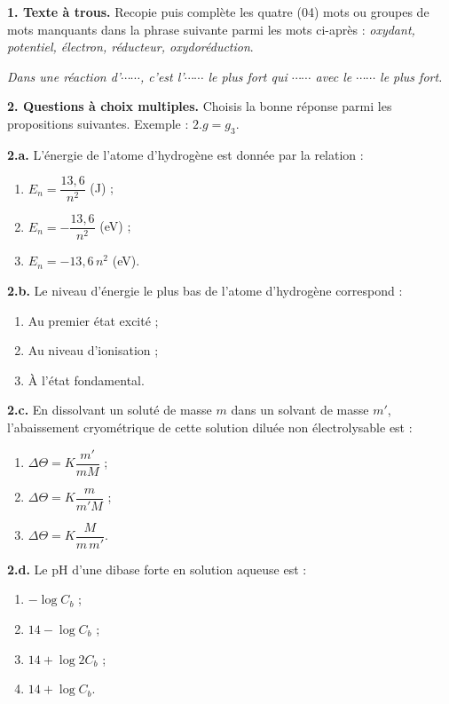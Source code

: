 \documentclass[11pt]{article}
\begin{document}



\noindent\textbf{1. Texte à trous.} Recopie puis complète les quatre (04) mots ou groupes de mots manquants dans la phrase suivante parmi les mots ci-après : \textit{oxydant, potentiel, électron, réducteur, oxydoréduction}.

\textit{Dans une réaction d'$\cdots\cdots$, c'est l'$\cdots\cdots$ le plus fort qui $\cdots\cdots$ avec le $\cdots\cdots$ le plus fort.}

\medskip
\noindent\textbf{2. Questions à choix multiples.} Choisis la bonne réponse parmi les propositions suivantes. Exemple : $2.g = g_3$.

\noindent\textbf{2.a.} L'énergie de l'atome d'hydrogène est donnée par la relation :
\begin{enumerate}[label=a\textsubscript{\arabic*}.]
  \item $E_n = \dfrac{13{,}6}{n^2}$ (J) ;
  \item $E_n = -\dfrac{13{,}6}{n^2}$ (eV) ;
  \item $E_n = -13{,}6\,n^2$ (eV).
\end{enumerate}

\noindent\textbf{2.b.} Le niveau d'énergie le plus bas de l'atome d'hydrogène correspond :
\begin{enumerate}[label=b\textsubscript{\arabic*}.]
  \item Au premier état excité ;
  \item Au niveau d'ionisation ;
  \item À l'état fondamental.
\end{enumerate}

\noindent\textbf{2.c.} En dissolvant un soluté de masse $m$ dans un solvant de masse $m'$, l'abaissement cryométrique de cette solution diluée non électrolysable est :
\begin{enumerate}[label=c\textsubscript{\arabic*}.]
  \item $\Delta\Theta = K\dfrac{m'}{mM}$ ;
  \item $\Delta\Theta = K\dfrac{m}{m'M}$ ;
  \item $\Delta\Theta = K\dfrac{M}{m\,m'}$.
\end{enumerate}

\noindent\textbf{2.d.} Le pH d'une dibase forte en solution aqueuse est :
\begin{enumerate}[label=d\textsubscript{\arabic*}.]
  \item $-\log C_b$ ;
  \item $14 - \log C_b$ ;
  \item $14 + \log 2C_b$ ;
  \item $14 + \log C_b$.
\end{enumerate}
\end{document}
